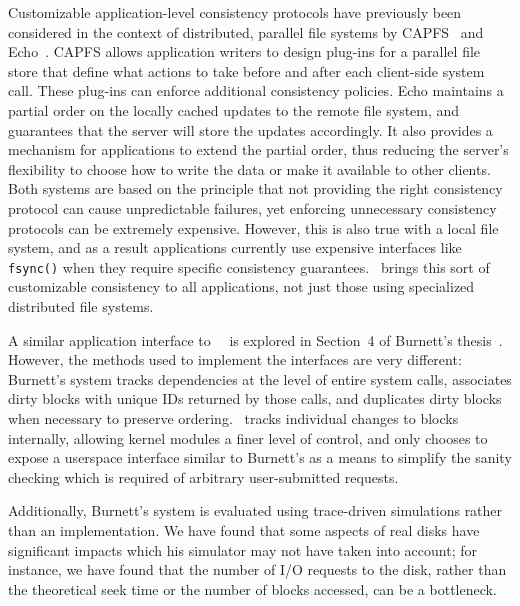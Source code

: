 Customizable application-level consistency protocols have previously been
considered in the context of distributed, parallel file systems by
CAPFS~\cite{vilayannur05providing} and Echo~\cite{mann94coherent}.
%
CAPFS allows application writers to design plug-ins for a parallel file store
that define what actions to take before and after each client-side system
call.
%
These plug-ins can enforce additional consistency policies.
%
Echo maintains a partial order on the locally cached updates to the remote file
system, and guarantees that the server will store the updates accordingly. It
also provides a mechanism for applications to extend the partial order, thus
reducing the server's flexibility to choose how to write the data or make it
available to other clients.
%
Both systems are based on the principle that not providing the right
consistency protocol can cause unpredictable failures, yet enforcing
unnecessary consistency protocols can be extremely expensive.
%
However, this is also true with a local file system, and as a result
applications currently use expensive interfaces like \texttt{fsync()} when
they require specific consistency guarantees.
%
\Kudos\ brings this sort of customizable consistency to all applications, not
just those using specialized distributed file systems.

A similar application interface to \Kudos\ \patchgroups\ is explored in
Section~4 of Burnett's thesis~\cite{burnett06information}. However, the methods
used to implement the interfaces are very different: Burnett's system tracks
dependencies at the level of entire system calls, associates dirty blocks with
unique IDs returned by those calls, and duplicates dirty blocks when necessary
to preserve ordering. \Kudos\ tracks individual changes to blocks internally,
allowing kernel modules a finer level of control, and only chooses to expose a
userspace interface similar to Burnett's as a means to simplify the sanity
checking which is required of arbitrary user-submitted requests.

Additionally, Burnett's system is evaluated using trace-driven simulations
rather than an implementation. We have found that some aspects of real disks
have significant impacts which his simulator may not have taken into account;
for instance, we have found that the number of I/O requests to the disk, rather
than the theoretical seek time or the number of blocks accessed, can be a
bottleneck.


